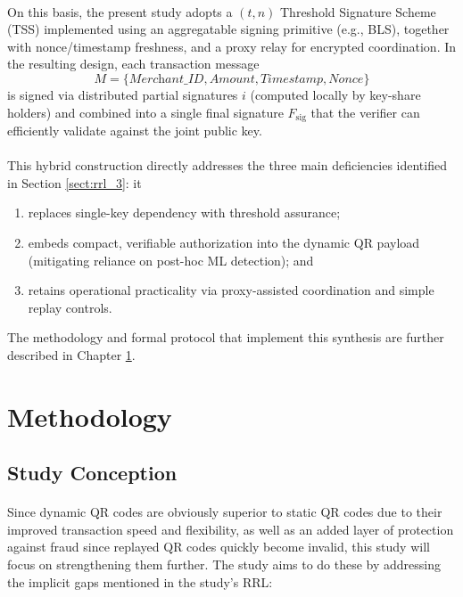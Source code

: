 \documentclass[a4paper]{scl-article}
\begin{document}
\paragraph{} 
On this basis, the present study adopts a $(t, n)$ Threshold Signature Scheme (TSS) implemented using an aggregatable signing primitive (e.g., BLS), together with nonce/timestamp freshness, and a proxy relay for encrypted coordination. In the resulting design, each transaction message 
\[
M = \{\textit{Merchant\_ID}, \textit{Amount}, \textit{Timestamp}, \textit{Nonce}\}
\] 
is signed via distributed partial signatures $i$ (computed locally by key-share holders) and combined into a single final signature $F_{\text{sig}}$ that the verifier can efficiently validate against the joint public key. 

\paragraph{}This hybrid construction directly addresses the three main deficiencies identified in Section \ref{sect:rrl_3}: it 
\begin{enumerate}
    \item replaces single-key dependency with threshold assurance;
    \item embeds compact, verifiable authorization into the dynamic QR payload (mitigating reliance on post-hoc ML detection); and
    \item retains operational practicality via proxy-assisted coordination and simple replay controls.
\end{enumerate}

The methodology and formal protocol that implement this synthesis are further described in Chapter \ref{header:methodology}.

\section{Methodology}
\label{header:methodology}
\subsection{Study Conception}
\label{sect:meth1}
\paragraph{}Since dynamic QR codes are obviously superior to static QR codes due to their improved transaction speed and flexibility, as well as an added layer of protection against fraud since replayed QR codes quickly become invalid, this study will focus on strengthening them further. The study aims to do these by addressing the implicit gaps mentioned in the study’s RRL:
\end{document}
